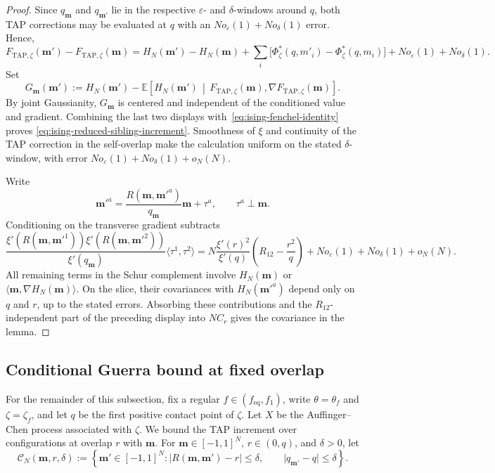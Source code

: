\documentclass[a4paper,10pt,reqno]{amsart}
\numberwithin{equation}{section}
\newcommand{\ve}{\varepsilon}
\newcommand{\dE}{\mathbb{E}}%
\newcommand{\mc}{\mathcal}
\newcommand{\TAP}{\mathrm{TAP}}
\newcommand{\eq}{\mathrm{eq}}
\newcommand{\bfm}{\mathbf{m}}
\begin{document}
\begin{proof}
		Since \(q_\bfm\) and \(q_{\bfm'}\) lie in the respective
		\(\ve\)- and \(\delta\)-windows around \(q\), both TAP corrections
		may be evaluated at \(q\) with an
		\(N o_\ve(1)+N o_\delta(1)\) error. Hence,
		\[
		F_{\TAP,\zeta}(\bfm')-F_{\TAP,\zeta}(\bfm)
		=
		H_N(\bfm')-H_N(\bfm)
		+\sum_i\bigl[\Phi_\zeta^*(q,m'_i)-\Phi_\zeta^*(q,m_i)\bigr]
		+N o_\ve(1)+N o_\delta(1).
		\]
		Set
		\[
		G_\bfm(\bfm')
		:=
		H_N(\bfm')
		-
		\dE\left[
		H_N(\bfm')
		\,\middle|\,
		F_{\TAP,\zeta}(\bfm),
		\nabla F_{\TAP,\zeta}(\bfm)
		\right].
		\]
		By joint Gaussianity, \(G_\bfm\) is centered and independent of the
		conditioned value and gradient.
		Combining the last two displays with~\eqref{eq:ising-fenchel-identity} proves
		\eqref{eq:ising-reduced-sibling-increment}.
		Smoothness of \(\xi\) and continuity of the TAP correction in the self-overlap
		make the calculation uniform on the stated \(\delta\)-window, with error
		\(N o_\ve(1)+N o_\delta(1)+o_N(N)\).
		
		Write
		\[
		\bfm'^a
		=
		\frac{R(\bfm,\bfm'^a)}{q_\bfm}\bfm+\tau^a,
		\qquad \tau^a\perp\bfm.
		\]
		Conditioning on the transverse gradient subtracts
		\[
		\frac{
			\xi'(R(\bfm,\bfm'^1))\xi'(R(\bfm,\bfm'^2))
		}{\xi'(q_\bfm)}
		\langle\tau^1,\tau^2\rangle
		=
		N\frac{\xi'(r)^2}{\xi'(q)}
		\left(R_{12}-\frac{r^2}{q}\right)
		+N o_\ve(1)+N o_\delta(1)+o_N(N).
		\]
		All remaining terms in the Schur complement involve \(H_N(\bfm)\) or
		\(\langle\bfm,\nabla H_N(\bfm)\rangle\). On the slice, their covariances
		with \(H_N(\bfm'^a)\) depend only on \(q\) and \(r\), up to the stated
		errors. Absorbing these contributions and the \(R_{12}\)-independent part
		of the preceding display into \(NC_r\) gives the covariance in the lemma.
	\end{proof}
	
	\subsection{Conditional Guerra bound at fixed overlap}
	
	For the remainder of this subsection, fix a regular
	\(f\in(f_{\eq},f_1)\), write
	\(\theta=\theta_f\) and \(\zeta=\zeta_f\), and let \(q\) be the first
	positive contact point of \(\zeta\). Let \(X\) be the
	Auffinger--Chen process associated with \(\zeta\).
	We bound the TAP increment over configurations at overlap \(r\) with \(\bfm\).
	For \(\bfm\in[-1,1]^N\), \(r\in(0,q)\), and \(\delta>0\), let
	\[
	\mc C_N(\bfm,r,\delta)
	:=
	\left\{
	\bfm'\in[-1,1]^N:
	\lvert R(\bfm,\bfm')-r\rvert\le\delta,
	\qquad
	\lvert q_{\bfm'}-q\rvert\le\delta
	\right\}.
	\]
	
\end{document}
